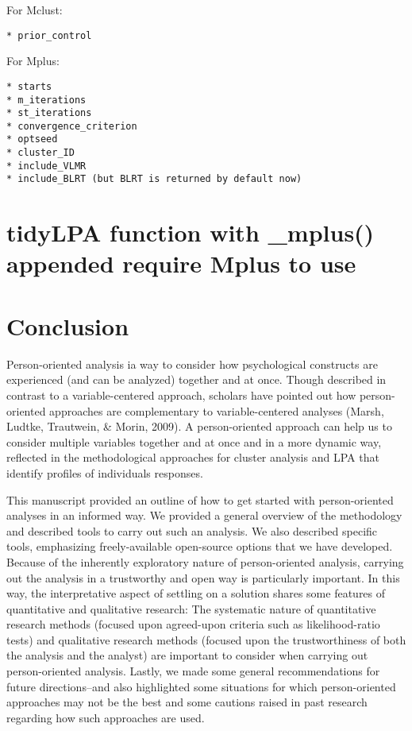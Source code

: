 \documentclass[man]{apa6}
\begin{document}
For Mclust:

\begin{verbatim}
* prior_control
\end{verbatim}

For Mplus:

\begin{verbatim}
* starts
* m_iterations
* st_iterations
* convergence_criterion
* optseed
* cluster_ID
* include_VLMR
* include_BLRT (but BLRT is returned by default now)
\end{verbatim}

\section{tidyLPA function with \_mplus() appended require Mplus to
use}\label{tidylpa-function-with-_mplus-appended-require-mplus-to-use}

\section{Conclusion}\label{conclusion}

Person-oriented analysis ia way to consider how psychological constructs
are experienced (and can be analyzed) together and at once. Though
described in contrast to a variable-centered approach, scholars have
pointed out how person-oriented approaches are complementary to
variable-centered analyses (Marsh, Ludtke, Trautwein, \& Morin, 2009). A
person-oriented approach can help us to consider multiple variables
together and at once and in a more dynamic way, reflected in the
methodological approaches for cluster analysis and LPA that identify
profiles of individuals responses.

This manuscript provided an outline of how to get started with
person-oriented analyses in an informed way. We provided a general
overview of the methodology and described tools to carry out such an
analysis. We also described specific tools, emphasizing freely-available
open-source options that we have developed. Because of the inherently
exploratory nature of person-oriented analysis, carrying out the
analysis in a trustworthy and open way is particularly important. In
this way, the interpretative aspect of settling on a solution shares
some features of quantitative and qualitative research: The systematic
nature of quantitative research methods (focused upon agreed-upon
criteria such as likelihood-ratio tests) and qualitative research
methods (focused upon the trustworthiness of both the analysis and the
analyst) are important to consider when carrying out person-oriented
analysis. Lastly, we made some general recommendations for future
directions--and also highlighted some situations for which
person-oriented approaches may not be the best and some cautions raised
in past research regarding how such approaches are used.
\end{document}
